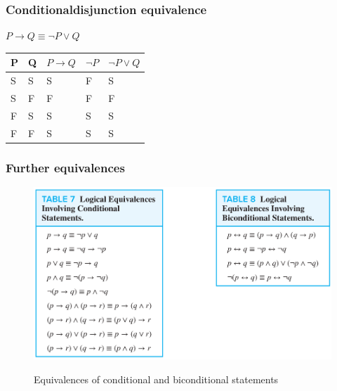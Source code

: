 \documentclass[12pt, a4paper]{article}
\begin{document}
				\subsubsection{Conditionaldisjunction equivalence}
					$P\rightarrow Q \equiv \neg P \lor Q$\\
					
					\begin{table}[h!]
					\begin{tabular}{|l|l|l|l|l|}
					\hline
					P & Q & $P\rightarrow Q$ & $\neg P$ & $\neg P \lor Q$ \\ \hline
					S & S & S                          & F                     & S                                           \\ \hline
					S & F & F                          & F                     & F                                           \\ \hline
					F & S & S                          & S                     & S                                           \\ \hline
					F & F & S                          & S                     & S                                           \\ \hline
					\end{tabular}
					\end{table}
				\subsubsection{Further equivalences}
					\begin{figure}[h!]
						\includegraphics[width=\linewidth]{assets/equivalences.png}
						\label{uquivalences}
						\caption{Equivalences of conditional and biconditional statements}
					\end{figure}
\end{document}
